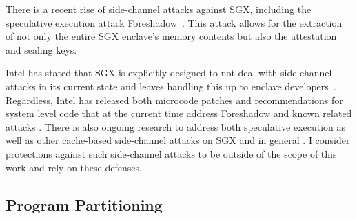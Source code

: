 %
There is a recent rise of side-channel attacks against SGX, including the
speculative execution attack Foreshadow~\cite{foreshadow,
weisse2018foreshadow}.  
%
This attack allows for the extraction of not only the entire SGX enclave's
memory contents but also the attestation and sealing keys.  


Intel has stated that SGX is explicitly designed to not deal
with side-channel attacks in its current state and leaves handling this up to
enclave developers~\cite{sgx-sidechannel, sgx-developers}.
%
Regardless, Intel has released both microcode patches and recommendations for
system level code that at the current time address Foreshadow and known related
attacks \cite{sgx-patch, canella2018systematic, weisse2018foreshadow}.  
%
There is also ongoing research to address both speculative execution as well as
other cache-based side-channel attacks on SGX and in general
\cite{yan2018invisispec, oleksenko2018varys, canella2018systematic, shih2017t}.
%
I consider protections against such side-channel attacks to be outside of the
scope of this work and rely on these defenses.


\subsection{Program Partitioning}



